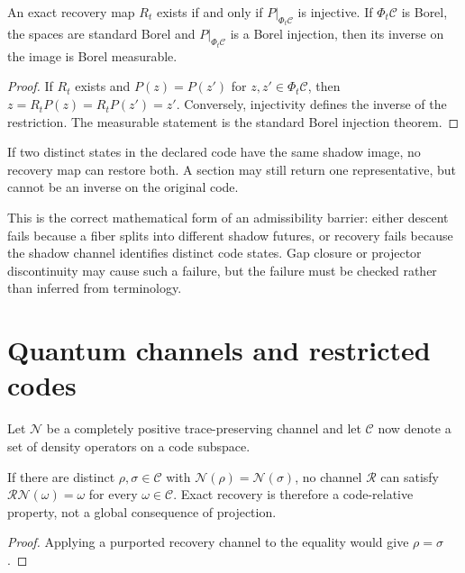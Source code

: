 \documentclass[11pt]{article}
\newcommand{\cC}{\mathcal C}
\newcommand{\cN}{\mathcal N}
\newcommand{\cR}{\mathcal R}
\begin{document}
\begin{theorem}\label{thm:recovery}
An exact recovery map $R_t$ exists if and only if
$P|_{\Phi_t\cC}$ is injective. If $\Phi_t\cC$ is Borel, the spaces are standard
Borel and $P|_{\Phi_t\cC}$ is a Borel injection, then its inverse on the image is
Borel measurable.
\end{theorem}

\begin{proof}
If $R_t$ exists and $P(z)=P(z')$ for $z,z'\in\Phi_t\cC$, then
$z=R_tP(z)=R_tP(z')=z'$. Conversely, injectivity defines the inverse of the
restriction. The measurable statement is the standard Borel injection theorem.
\end{proof}

\begin{corollary}
If two distinct states in the declared code have the same shadow image, no recovery
map can restore both. A section may still return one representative, but cannot be
an inverse on the original code.
\end{corollary}

This is the correct mathematical form of an admissibility barrier: either descent
fails because a fiber splits into different shadow futures, or recovery fails because
the shadow channel identifies distinct code states. Gap closure or projector
discontinuity may cause such a failure, but the failure must be checked rather than
inferred from terminology.

\section{Quantum channels and restricted codes}

Let $\cN$ be a completely positive trace-preserving channel and let $\cC$ now denote
a set of density operators on a code subspace.

\begin{proposition}\label{prop:channel}
If there are distinct $\rho,\sigma\in\cC$ with
$\cN(\rho)=\cN(\sigma)$, no channel $\cR$ can satisfy
$\cR\cN(\omega)=\omega$ for every $\omega\in\cC$. Exact recovery is therefore a
code-relative property, not a global consequence of projection.
\end{proposition}

\begin{proof}
Applying a purported recovery channel to the equality would give $\rho=\sigma$.
\end{proof}
\end{document}
